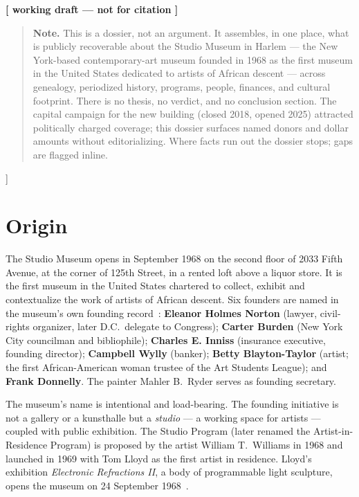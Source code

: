 \documentclass[10pt,letterpaper,twocolumn]{article}
\begin{document}
{\begin{center}
{\small\color{acpink}\textbf{[ working draft --- not for citation ]}}
\end{center}
\vspace{0.3em}

\begin{quote}
\small\noindent\textbf{Note.} This is a dossier, not an argument. It assembles, in one place, what is publicly recoverable about the Studio Museum in Harlem --- the New York-based contemporary-art museum founded in 1968 as the first museum in the United States dedicated to artists of African descent --- across genealogy, periodized history, programs, people, finances, and cultural footprint. There is no thesis, no verdict, and no conclusion section. The capital campaign for the new building (closed 2018, opened 2025) attracted politically charged coverage; this dossier surfaces named donors and dollar amounts without editorializing. Where facts run out the dossier stops; gaps are flagged inline.
\end{quote}
\vspace{0.5em}
}]

\section{Origin}

The Studio Museum opens in September 1968 on the second floor of 2033 Fifth Avenue, at the corner of 125th Street, in a rented loft above a liquor store. It is the first museum in the United States chartered to collect, exhibit and contextualize the work of artists of African descent. Six founders are named in the museum's own founding record~\citep{smh2026history}: \textbf{Eleanor Holmes Norton} (lawyer, civil-rights organizer, later D.C.~delegate to Congress); \textbf{Carter Burden} (New York City councilman and bibliophile); \textbf{Charles E. Inniss} (insurance executive, founding director); \textbf{Campbell Wylly} (banker); \textbf{Betty Blayton-Taylor} (artist; the first African-American woman trustee of the Art Students League); and \textbf{Frank Donnelly}. The painter Mahler B.~Ryder serves as founding secretary.

The museum's name is intentional and load-bearing. The founding initiative is not a gallery or a kunsthalle but a \emph{studio} --- a working space for artists --- coupled with public exhibition. The Studio Program (later renamed the Artist-in-Residence Program) is proposed by the artist William T.~Williams in 1968 and launched in 1969 with Tom Lloyd as the first artist in residence. Lloyd's exhibition \emph{Electronic Refractions II}, a body of programmable light sculpture, opens the museum on 24 September 1968~\citep{smh2026history,wikipedia2026smh}.
\end{document}
